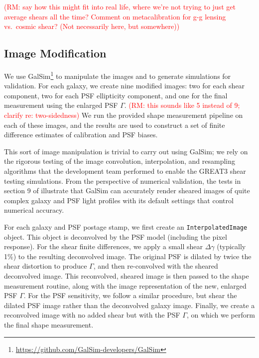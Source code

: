\documentclass[iop]{emulateapj}
\newcommand\rmcomment[1]{\textcolor{red}{(RM: #1)}}
\begin{document}
\rmcomment{say how this might fit into real life, where we're not
  trying to just get average shears all the time?  Comment on
  metacalibration for g-g lensing vs.\ cosmic shear?  (Not necessarily
  here, but somewhere)}

\subsection{Image Modification}
We use
GalSim\footnote{\url{https://github.com/GalSim-developers/GalSim}}
to manipulate the images and to generate
simulations for validation. For each galaxy, we create nine modified
images: two for each shear component, two for each PSF ellipticity
component, and one for the final measurement using the enlarged PSF $\Gamma$. \rmcomment{this sounds
  like 5 instead of 9; clarify re: two-sidedness} We run the provided
shape measurement pipeline on each of these images, and the results
are used to construct a set of finite difference estimates of
calibration and PSF biases.

This sort of image manipulation is trivial to carry out using GalSim; 
we rely on the rigorous testing of the
image convolution, interpolation, and resampling algorithms that the
development team performed to enable the GREAT3 shear testing
simulations.  From the perspective of numerical validation, the tests
in section 9 of \cite{2015A&C....10..121R} illustrate that GalSim can
accurately render sheared images of quite complex galaxy and PSF light
profiles with its default settings that control numerical accuracy.

For each galaxy and PSF postage stamp, we first create an
\texttt{InterpolatedImage} object. This object is deconvolved by the
PSF model (including the pixel response). For the shear finite
differences, we apply a small shear $\Delta\gamma$ (typically 1\%) to
the resulting deconvolved image. The original PSF is dilated by twice
the shear distortion to produce $\Gamma$, and then re-convolved with
the sheared deconvolved image. This reconvolved, sheared image is then
passed to the shape measurement routine, along with the image
representation of the new, enlarged PSF $\Gamma$. For the PSF
sensitivity, we follow a similar procedure, but shear the dilated PSF
image rather than the deconvolved galaxy image. Finally, we create a
reconvolved image with no added shear but with the PSF $\Gamma$, on
which we perform the final shape measurement.
\end{document}
